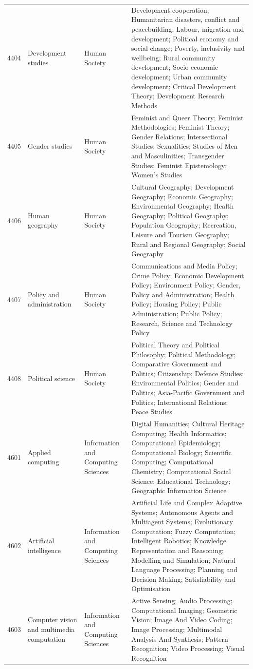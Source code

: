 \begin{longtable}{r p{2.45cm} p{2.55cm} p{6.15cm}}
4404 & Development studies & Human Society & Development cooperation; Humanitarian disasters, conflict and peacebuilding; Labour, migration and development; Political economy and social change; Poverty, inclusivity and wellbeing; Rural community development; Socio-economic development; Urban community development; Critical Development Theory; Development Research Methods \\
4405 & Gender studies & Human Society & Feminist and Queer Theory; Feminist Methodologies; Feminist Theory; Gender Relations; Intersectional Studies; Sexualities; Studies of Men and Masculinities; Transgender Studies; Feminist Epistemology; Women's Studies \\
4406 & Human geography & Human Society & Cultural Geography; Development Geography; Economic Geography; Environmental Geography; Health Geography; Political Geography; Population Geography; Recreation, Leisure and Tourism Geography; Rural and Regional Geography; Social Geography \\
4407 & Policy and administration & Human Society & Communications and Media Policy; Crime Policy; Economic Development Policy; Environment Policy; Gender, Policy and Administration; Health Policy; Housing Policy; Public Administration; Public Policy; Research, Science and Technology Policy \\
4408 & Political science & Human Society & Political Theory and Political Philosophy; Political Methodology; Comparative Government and Politics; Citizenship; Defence Studies; Environmental Politics; Gender and Politics; Asia-Pacific Government and Politics; International Relations; Peace Studies \\
4601 & Applied computing & Information and Computing Sciences & Digital Humanities; Cultural Heritage Computing; Health Informatics; Computational Epidemiology; Computational Biology; Scientific Computing; Computational Chemistry; Computational Social Science; Educational Technology; Geographic Information Science \\
4602 & Artificial intelligence & Information and Computing Sciences & Artificial Life and Complex Adaptive Systems; Autonomous Agents and Multiagent Systems; Evolutionary Computation; Fuzzy Computation; Intelligent Robotics; Knowledge Representation and Reasoning; Modelling and Simulation; Natural Language Processing; Planning and Decision Making; Satisfiability and Optimisation \\
4603 & Computer vision and multimedia computation & Information and Computing Sciences & Active Sensing; Audio Processing; Computational Imaging; Geometric Vision; Image And Video Coding; Image Processing; Multimodal Analysis And Synthesis; Pattern Recognition; Video Processing; Visual Recognition \\

\end{longtable}
